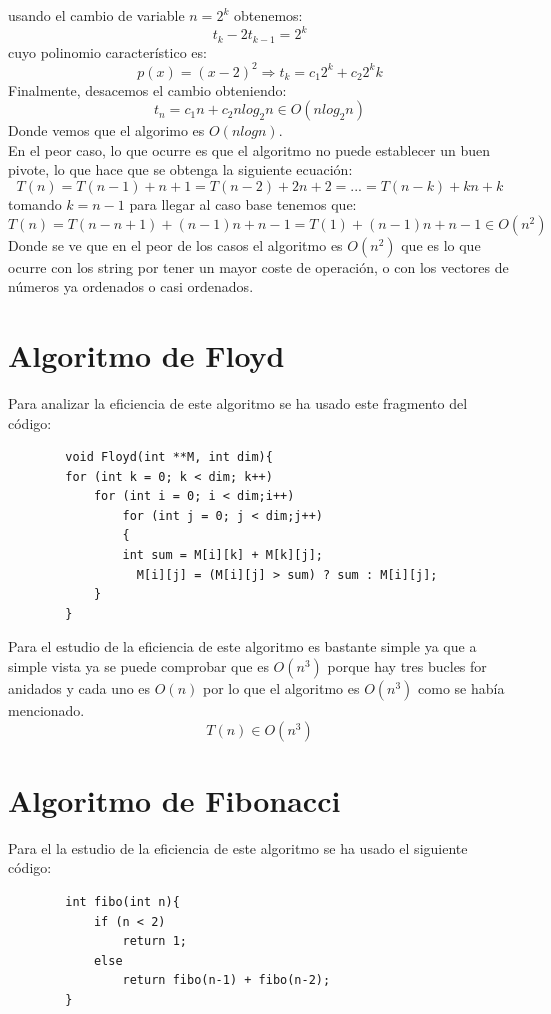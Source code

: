 \documentclass[11pt,openany]{book}
\begin{document}
        usando el cambio de variable $n=2^k$ obtenemos:
        \begin{equation*}
            t_k - 2t_{k-1} = 2^k 
        \end{equation*}
        cuyo polinomio característico es: $$p(x)=(x-2)^2 \Rightarrow t_k=c_1 2^k + c_2 2^k k$$
        Finalmente, desacemos el cambio obteniendo: 
        \begin{equation*}
            t_n = c_1 n + c_2 n log_2 n \in O(nlog_2 n)
        \end{equation*}
        Donde vemos que el algorimo es $O(nlog n)$.\\
        En el peor caso, lo que ocurre es que el algoritmo no puede establecer un buen pivote, lo que hace que se obtenga la siguiente
        ecuación:
        \begin{equation*}
            T(n)=T(n-1)+n+1= T(n-2)+2n+2=...=T(n-k)+kn+k
        \end{equation*}
        tomando $k=n-1$ para llegar al caso base tenemos que:
        \begin{equation*}
            T(n)=T(n-n+1)+(n-1)n+n-1=T(1)+(n-1)n+n-1 \in O(n^2)
        \end{equation*}
        Donde se ve que en el peor de los casos el algoritmo es $O(n^2)$ que es lo que ocurre con los string por tener un mayor coste de 
        operación, o con los vectores de números ya ordenados o casi ordenados.

        \section*{Algoritmo de Floyd}
        Para analizar la eficiencia de este algoritmo se ha usado este fragmento del código:
        \begin{lstlisting}
        void Floyd(int **M, int dim){
        for (int k = 0; k < dim; k++)
            for (int i = 0; i < dim;i++)
                for (int j = 0; j < dim;j++)
                {
                int sum = M[i][k] + M[k][j];    	
                  M[i][j] = (M[i][j] > sum) ? sum : M[i][j];
            }
        }	     	
        \end{lstlisting}
        Para el estudio de la eficiencia de este algoritmo es bastante simple ya que a simple vista ya se puede comprobar que es $O(n^3)$ porque hay 
        tres bucles for anidados y cada uno es $O(n)$ por lo que el algoritmo es $O(n^3)$ como se había mencionado.
        $$T(n) \in O(n^3)$$

        \section*{Algoritmo de Fibonacci}
        Para el la estudio de la eficiencia de este algoritmo se ha usado el siguiente código:
        \begin{lstlisting}
        int fibo(int n){
            if (n < 2)
                return 1;
            else
                return fibo(n-1) + fibo(n-2);
        }
            
        \end{lstlisting}
\end{document}
